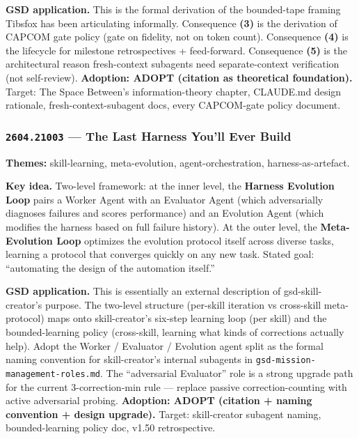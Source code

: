 \documentclass[11pt,letterpaper]{article}
\newcommand{\arxivid}[1]{\texttt{\textcolor{accent}{#1}}}
\newcommand{\paperhead}[2]{\noindent\textbf{\sffamily\textcolor{secondary}{#1}} \textemdash{} #2}
\begin{document}
\textbf{GSD application.} This is the formal derivation of the bounded-tape framing Tibsfox has been articulating informally. Consequence \textbf{(3)} is the derivation of CAPCOM gate policy (gate on fidelity, not on token count). Consequence \textbf{(4)} is the lifecycle for milestone retrospectives + feed-forward. Consequence \textbf{(5)} is the architectural reason fresh-context subagents need separate-context verification (not self-review). \textbf{Adoption: ADOPT (citation as theoretical foundation).} Target: The Space Between's information-theory chapter, CLAUDE.md design rationale, fresh-context-subagent docs, every CAPCOM-gate policy document.

\subsubsection{\arxivid{2604.21003} --- The Last Harness You'll Ever Build}

\paperhead{Themes:}{skill-learning, meta-evolution, agent-orchestration, harness-as-artefact.}

\textbf{Key idea.} Two-level framework: at the inner level, the \textbf{Harness Evolution Loop} pairs a Worker Agent with an Evaluator Agent (which adversarially diagnoses failures and scores performance) and an Evolution Agent (which modifies the harness based on full failure history). At the outer level, the \textbf{Meta-Evolution Loop} optimizes the evolution protocol itself across diverse tasks, learning a protocol that converges quickly on any new task. Stated goal: ``automating the design of the automation itself.''

\textbf{GSD application.} This is essentially an external description of gsd-skill-creator's purpose. The two-level structure (per-skill iteration vs cross-skill meta-protocol) maps onto skill-creator's six-step learning loop (per skill) and the bounded-learning policy (cross-skill, learning what kinds of corrections actually help). Adopt the Worker / Evaluator / Evolution agent split as the formal naming convention for skill-creator's internal subagents in \texttt{gsd-mission-management-roles.md}. The ``adversarial Evaluator'' role is a strong upgrade path for the current 3-correction-min rule --- replace passive correction-counting with active adversarial probing. \textbf{Adoption: ADOPT (citation + naming convention + design upgrade).} Target: skill-creator subagent naming, bounded-learning policy doc, v1.50 retrospective.

\end{document}
